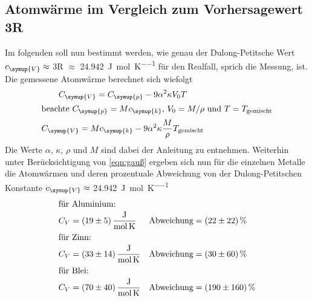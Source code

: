 \subsection{Atomwärme im Vergleich zum Vorhersagewert 3R}
Im folgenden soll nun bestimmt werden, wie genau der Dulong-Petitsche
Wert $c_\symup{V}\approx$ 3R $\approx$ \SI{24,942}{\joule\per\mol\per\kelvin}
für den Realfall, sprich die Messung, ist. Die gemessene Atomwärme
berechnet sich wiefolgt
\begin{gather}
  C_\symup{V}=C_\symup{p}-9\alpha^2\kappa V_0T\\
  \intertext{beachte $C_\symup{p}=Mc_\symup{k}$, $V_0 = M/\rho$ und $T=T_\text{gemischt}$}
  C_\symup{V}=Mc_\symup{k}-9\alpha^2\kappa\frac{M}{\rho}T_\text{gemischt}
  \label{eqn:CV}
\end{gather}
Die Werte $\alpha$, $\kappa$, $\rho$ und $M$ sind dabei der
Anleitung zu entnehmen. Weiterhin unter Berücksichtigung von \eqref{eqn:gauß}
ergeben sich nun für die einzelnen Metalle die Atomwärmen und deren
prozentuale Abweichung von der Dulong-Petitschen Konstante
$c_\symup{V}\approx$ \SI{24,942}{\joule\per\mol\per\kelvin}
\begin{align*}
  \intertext{für Aluminium:}
  C_V&=\SI{19(5)}{\joule\per\mol\per\kelvin}&
  \text{Abweichung}&=\SI{22(22)}{\percent}\\
  \intertext{für Zinn:}
  C_V&=\SI{33(14)}{\joule\per\mol\per\kelvin}&
  \text{Abweichung}&=\SI{30(60)}{\percent}\\
  \intertext{für Blei:}
  C_V&=\SI{70(40)}{\joule\per\mol\per\kelvin}&
  \text{Abweichung}&=\SI{190(160)}{\percent}
\end{align*}
